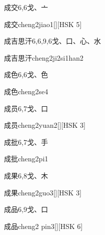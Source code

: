 \begin{entry}{成交}{6,6}{⼽、⼇}
  \begin{phonetics}{成交}{cheng2jiao1}[][HSK 5]
  \end{phonetics}
\end{entry}

\begin{entry}{成吉思汗}{6,6,9,6}{⼽、⼝、⼼、⽔}
  \begin{phonetics}{成吉思汗}{cheng2ji2si1han2}
  \end{phonetics}
\end{entry}

\begin{entry}{成色}{6,6}{⼽、⾊}
  \begin{phonetics}{成色}{cheng2se4}
  \end{phonetics}
\end{entry}

\begin{entry}{成员}{6,7}{⼽、⼝}
  \begin{phonetics}{成员}{cheng2yuan2}[][HSK 3]
  \end{phonetics}
\end{entry}

\begin{entry}{成批}{6,7}{⼽、⼿}
  \begin{phonetics}{成批}{cheng2pi1}
  \end{phonetics}
\end{entry}

\begin{entry}{成果}{6,8}{⼽、⽊}
  \begin{phonetics}{成果}{cheng2guo3}[][HSK 3]
  \end{phonetics}
\end{entry}

\begin{entry}{成品}{6,9}{⼽、⼝}
  \begin{phonetics}{成品}{cheng2 pin3}[][HSK 6]
  \end{phonetics}
\end{entry}

